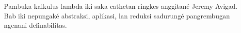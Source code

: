 \documentclass[../../../include/open-logic-chapter]{subfiles}
\begin{document}

\begin{editorial}
Pambuka kalkulus lambda iki saka cathetan ringkes anggitané Jeremy Avigad. Bab iki nepungaké abstraksi, aplikasi, lan reduksi sadurungé pangrembugan ngenani definabilitas.
\end{editorial}














\OLEndChapterHook
\end{document}
